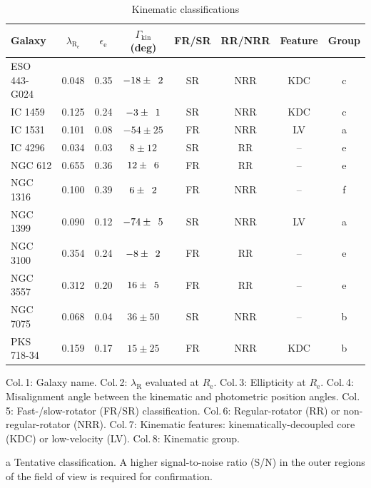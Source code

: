 		\begin{table}
			\centering
		\begin{threeparttable}
			\caption{Kinematic classifications}
			\label{tab:classify}
			\begin{tabular}{l c c c c c c c}
				\hline
				\hline
				Galaxy		& $\lambda_\mathrm{R_e}$ & $\epsilon_\mathrm{e}$  & $\Gamma_\text{kin}$ (deg) & FR/SR 	& RR/NRR 	& Feature & Group 	\\
				\hline 
				ESO 443-G024 & 0.048 & 0.35 & $-18\pm\leavevmode\phantom{0}2$	& SR & NRR & KDC & c \\
				IC 1459 	& 0.125 & 0.24 & \leavevmode\phantom{0}$-3\pm\leavevmode\phantom{0}1$ & SR & NRR & KDC & c \\
				IC 1531 	& 0.101 & 0.08 & $-54\pm25$	& FR & NRR & LV & a \\
				IC 4296		& 0.034 & 0.03 & \leavevmode\phantom{$-0$}$8\pm12$ & SR &\leavevmode\phantom{N}RR & -- & e \\
				NGC 612 	& 0.655 & 0.36 & \leavevmode\phantom{$-$}$12\pm\leavevmode\phantom{0}6$	& FR &\leavevmode\phantom{N}RR & -- & e \\
				NGC 1316 	& 0.100 & 0.39 & \leavevmode\phantom{$-0$}$6\pm\leavevmode\phantom{0}2$ & FR & NRR & -- & f \\
				NGC 1399 	& 0.090 & 0.12 & $-74\pm\leavevmode\phantom{0}5$ & SR & NRR & LV & a \\
				NGC 3100 	& 0.354 & 0.24 & \leavevmode\phantom{0}$-8\pm\leavevmode\phantom{0}2$ & FR &\leavevmode\phantom{N}RR & -- & e \\
				NGC 3557 	& 0.312 & 0.20 & \leavevmode\phantom{$-$}$16\pm\leavevmode\phantom{0}5$ & FR &\leavevmode\phantom{N}RR & -- & e\\
				NGC 7075 	& 0.068 & 0.04 & \leavevmode\phantom{$-$}$36\pm50$ & SR & NRR & -- & b \\
				PKS 718-34  & 0.159 & 0.17 & \leavevmode\phantom{$-$}$15\pm25$ & FR & NRR & KDC\tnote{a} & b\\
				\hline
				\hline
			\end{tabular}
			\begin{tablenotes}
			\footnotesize
			\note Col.\,1: Galaxy name. Col.\,2: $\lambda_\mathrm{R}$ evaluated at $R_\mathrm{e}$. Col.\,3: Ellipticity at $R_\mathrm{e}$. Col.\,4: Misalignment angle between the kinematic and photometric position angles. Col.\,5: Fast-/slow-rotator (FR/SR) classification. Col.\,6: Regular-rotator (RR) or non-regular-rotator (NRR). Col.\,7: Kinematic features: kinematically-decoupled core (KDC) or low-velocity (LV). Col.\,8: Kinematic group.
			\item [a] Tentative classification. A higher signal-to-noise ratio (S/N) in the outer regions of the field of view is required for confirmation.
			\end{tablenotes}
		\end{threeparttable}
		\end{table}

